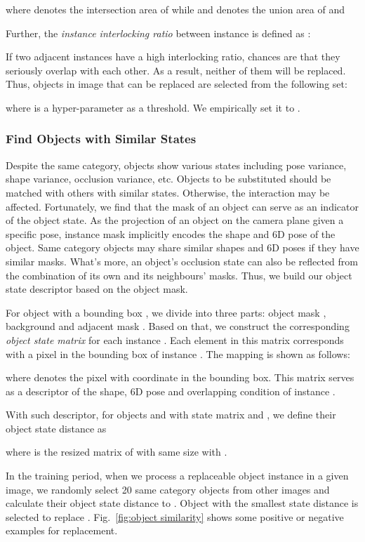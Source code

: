 \documentclass[10pt,twocolumn,letterpaper]{article}
\begin{document}
where  denotes the intersection area of  while  and  denotes the union area of  and 

Further, the \textit{instance interlocking ratio} between instance  is defined as :



If two adjacent instances have a high interlocking ratio, chances are that they seriously overlap with each other. As a result, neither of them will be replaced. Thus, objects in image  that can be replaced are selected from the following set:

where  is a hyper-parameter as a threshold. We empirically set it to .

\subsubsection{Find Objects with Similar States}
Despite the same category, objects show various states including pose variance, shape variance, occlusion variance, etc. Objects to be substituted should be matched with others with similar states. Otherwise, the interaction may be affected. Fortunately, we find that the mask of an object can serve as an indicator of the object state. As the projection of an object on the camera plane given a specific pose, instance mask implicitly encodes the shape and 6D pose of the object. Same category objects may share similar shapes and 6D poses if they have similar masks. What's more, an object's occlusion state can also be reflected from the combination of its own and its neighbours' masks. Thus, we build our object state descriptor based on the object mask.

For object  with a  bounding box , we divide  into three parts: object mask , background  and adjacent mask . Based on that, we construct the corresponding \textit{object state matrix}  for each instance .  Each element in this matrix corresponds with a pixel in the bounding box of instance . The mapping is shown as follows:

where  denotes the pixel with coordinate  in the bounding box. This matrix  serves as a descriptor of the shape, 6D pose and overlapping condition of instance .

With such descriptor, for objects  and  with state matrix  and , we define their object state distance  as

where  is the resized matrix of  with same size with .

In the training period, when we process a replaceable object instance  in a given image, we randomly select 20 same category objects from other images and calculate their object state distance to . Object with the smallest state distance is selected to replace . Fig.~\ref{fig:object similarity} shows some positive or negative examples for replacement.
\end{document}
